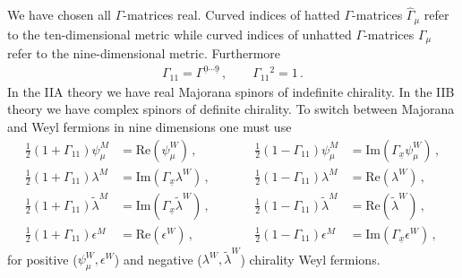 \documentclass[12pt,a4paper]{article}
\begin{document}
We have chosen all $\Gamma$-matrices real. Curved indices of hatted $\Gamma$-matrices $\hat \Gamma_{\mu}$
refer to the ten-dimensional metric while curved indices of unhatted $\Gamma$-matrices $\Gamma_{\mu}$
refer to the nine-dimensional metric. Furthermore
\begin{align}
  \Gamma_{11} = \Gamma^{\underline{0} \cdots \underline{9}} \,, \qquad \Gamma_{11}{}^2 = 1 \,.
\end{align}
In the IIA theory we have real Majorana spinors of indefinite chirality. In the IIB theory we
have complex spinors of definite chirality. To switch between Majorana and Weyl fermions in nine
dimensions one must use
\begin{equation}
\begin{aligned}
  \tfrac{1}{2} (1+\Gamma_{11}) \psi_\mu^M & = \text{Re} (\psi_\mu^W)\, , \\
  \tfrac{1}{2} (1+\Gamma_{11}) \lambda^M & = \text{Im} (\Gamma_{\underline{x}} \lambda^W)\,, \\
  \tfrac{1}{2} (1+\Gamma_{11}) \tilde\lambda^M & = \text{Im} (\Gamma_{\underline{x}} \tilde\lambda^W)\,, \\
  \tfrac{1}{2} (1+\Gamma_{11}) \epsilon^M & = \text{Re} (\epsilon^W)\,,\qquad\qquad
\end{aligned}
\begin{aligned}
  \tfrac{1}{2} (1-\Gamma_{11}) \psi_\mu^M & = \text{Im} (\Gamma_{\underline{x}} \psi_\mu^W)\, , \\ 
  \tfrac{1}{2} (1-\Gamma_{11}) \lambda^M & = \text{Re} (\lambda^W)\, , \\
  \tfrac{1}{2} (1-\Gamma_{11}) \tilde\lambda^M & = \text{Re}
    (\tilde\lambda^W)\, , \\
  \tfrac{1}{2} (1-\Gamma_{11}) \epsilon^M & = \text{Im} (\Gamma_{\underline{x}} \epsilon^W)\, ,
\end{aligned}
\end{equation}
for positive ($\psi_\mu^W, \epsilon^W$) and negative ($\lambda^W,\tilde\lambda^W$) chirality Weyl fermions.
\end{document}
